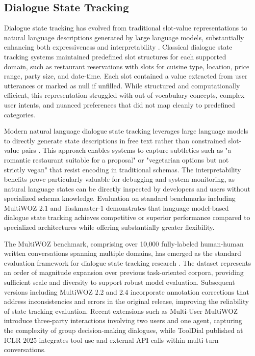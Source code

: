 \documentclass[11pt,letterpaper]{article}
\begin{document}
\subsection{Dialogue State Tracking}

Dialogue state tracking has evolved from traditional slot-value representations to natural language descriptions generated by large language models, substantially enhancing both expressiveness and interpretability \cite{feng2021dialogue}. Classical dialogue state tracking systems maintained predefined slot structures for each supported domain, such as restaurant reservations with slots for cuisine type, location, price range, party size, and date-time. Each slot contained a value extracted from user utterances or marked as null if unfilled. While structured and computationally efficient, this representation struggled with out-of-vocabulary concepts, complex user intents, and nuanced preferences that did not map cleanly to predefined categories.

Modern natural language dialogue state tracking leverages large language models to directly generate state descriptions in free text rather than constrained slot-value pairs \cite{feng2021dialogue}. This approach enables systems to capture subtleties such as "a romantic restaurant suitable for a proposal" or "vegetarian options but not strictly vegan" that resist encoding in traditional schemas. The interpretability benefits prove particularly valuable for debugging and system monitoring, as natural language states can be directly inspected by developers and users without specialized schema knowledge. Evaluation on standard benchmarks including MultiWOZ 2.1 and Taskmaster-1 demonstrates that language model-based dialogue state tracking achieves competitive or superior performance compared to specialized architectures while offering substantially greater flexibility.

The MultiWOZ benchmark, comprising over 10,000 fully-labeled human-human written conversations spanning multiple domains, has emerged as the standard evaluation framework for dialogue state tracking research \cite{budzianowski2018multiwoz}. The dataset represents an order of magnitude expansion over previous task-oriented corpora, providing sufficient scale and diversity to support robust model evaluation. Subsequent versions including MultiWOZ 2.2 and 2.4 incorporate annotation corrections that address inconsistencies and errors in the original release, improving the reliability of state tracking evaluation. Recent extensions such as Multi-User MultiWOZ introduce three-party interactions involving two users and one agent, capturing the complexity of group decision-making dialogues, while ToolDial published at ICLR 2025 integrates tool use and external API calls within multi-turn conversations.
\end{document}
